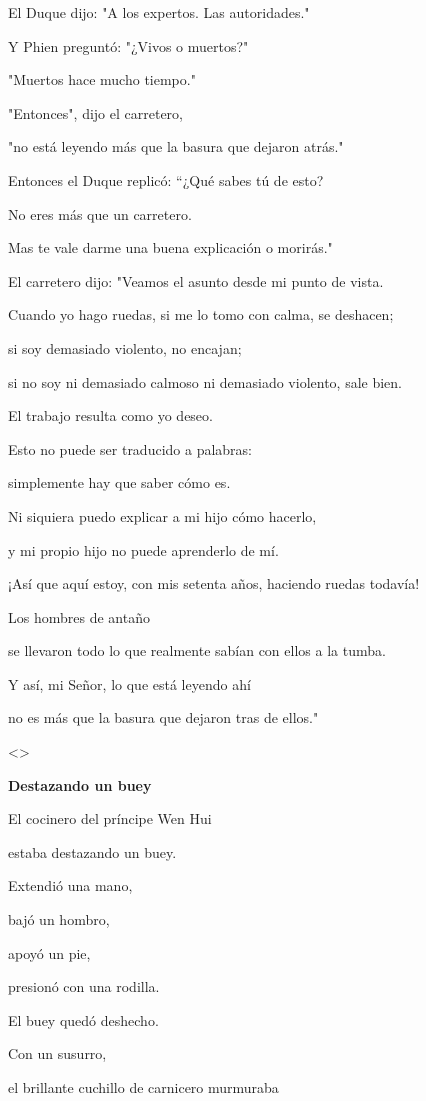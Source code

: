 El Duque dijo: "A los expertos. Las autoridades."

Y Phien preguntó: "¿Vivos o muertos?"

"Muertos hace mucho tiempo."

"Entonces", dijo el carretero,

"no está leyendo más que la basura que dejaron atrás."

Entonces el Duque replicó: ``¿Qué sabes tú de esto?

No eres más que un carretero.

Mas te vale darme una buena explicación o morirás."

El carretero dijo: "Veamos el asunto desde mi punto de vista.

Cuando yo hago ruedas, si me lo tomo con calma, se deshacen;

si soy demasiado violento, no encajan;

si no soy ni demasiado calmoso ni demasiado violento, sale bien.

El trabajo resulta como yo deseo.

Esto no puede ser traducido a palabras:

simplemente hay que saber cómo es.

Ni siquiera puedo explicar a mi hijo cómo hacerlo,

y mi propio hijo no puede aprenderlo de mí.

¡Así que aquí estoy, con mis setenta años, haciendo ruedas todavía!

Los hombres de antaño

se llevaron todo lo que realmente sabían con ellos a la tumba.

Y así, mi Señor, lo que está leyendo ahí

no es más que la basura que dejaron tras de ellos."

\textless\textgreater{}

\textbf{{Destazando un buey}}

El cocinero del príncipe Wen Hui

estaba destazando un buey.

Extendió una mano,

bajó un hombro,

apoyó un pie,

presionó con una rodilla.

El buey quedó deshecho.

Con un susurro,

el brillante cuchillo de carnicero murmuraba

